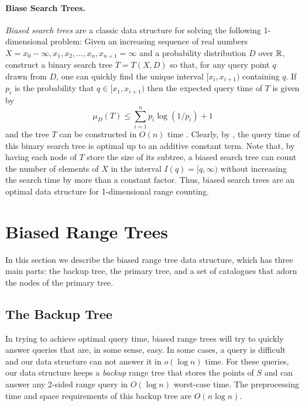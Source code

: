 \documentclass[lotsofwhite,charterfonts]{patmorin}
\begin{document}
\paragraph{Biase Search Trees.}

\emph{Biased search trees} are a classic data structure for solving
the following 1-dimensional problem:  Given an increasing sequence of real numbers
$X=x_0-\infty,x_1,x_2,\ldots , x_n,x_{n+1}=\infty$ and a probability
distribution $D$ over $\mathbb{R}$, construct a binary search tree  $T=T(X,D)$ so that, for any query
point $q$ drawn from $D$, one can quickly find the unique interval
$[x_i,x_{i+1})$ containing $q$.  If $p_i$ is the probability that
$q\in[x_1,x_{i+1})$ then the expected query time of $T$ is given by
\[
   \mu_D(T) \le \sum_{i=1}^{n} p_i\log(1/p_i) + 1 
\]
and the tree $T$ can be constructed in $O(n)$ time \cite{mehlhornXX}.
Clearly, by , the query time of this binary search
tree is optimal up to an additive constant term.  Note that, by having
each node of $T$ store the size of its subtree, a biased search tree
can count the number of elements of $X$ in the interval
$I(q)=[q,\infty)$ without increasing the search time by more than a
constant factor.  Thus, biased search trees are an optimal data
structure for 1-dimensional range counting.

\section{Biased Range Trees}

In this section we describe the biased range tree data structure,
which has three main parts: the backup tree, the primary tree, and a
set of catalogues that adorn the nodes of the primary tree.

\subsection{The Backup Tree}

In trying to achieve optimal query time, biased range trees will try
to quickly answer queries that are, in some sense, easy.  In some
cases, a query is difficult and our data structure can not answer it
in $o(\log n)$ time.  For these queries, our data structure keeps a
\emph{backup} range tree that stores the points of $S$ and can answer
any 2-sided range query in $O(\log n)$ worst-case time.  The
preprocessing time and space requirements of this backup tree are
$O(n\log n)$.
\end{document}
